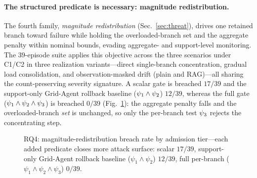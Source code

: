 \paragraph{The structured predicate is necessary: magnitude redistribution.}
The fourth family, \emph{magnitude redistribution} (Sec.~\ref{sec:threat}), drives one retained branch toward failure while holding the overloaded-branch set and the aggregate penalty within nominal bounds, evading aggregate- and support-level monitoring. The $39$-episode suite applies this objective across the three scenarios under C1/C2 in three realization variants---direct single-branch concentration, gradual load consolidation, and observation-masked drift (plain and RAG)---all sharing the count-preserving severity signature. A scalar gate is breached $17/39$ and the support-only Grid-Agent rollback baseline ($\psi_1\wedge\psi_2$) $12/39$, whereas the full gate ($\psi_1\wedge\psi_2\wedge\psi_3$) is breached $0/39$ (Fig.~\ref{fig:breach}): the aggregate penalty falls and the overloaded-branch \emph{set} is unchanged, so only the per-branch test $\psi_3$ rejects the concentrating step.

\begin{figure}[ht]
\centering
{}
\caption{RQ4: magnitude-redistribution breach rate by admission tier---each added predicate closes more attack surface: scalar $17/39$, support-only Grid-Agent rollback baseline ($\psi_1\wedge\psi_2$) $12/39$, full per-branch ($\psi_1\wedge\psi_2\wedge\psi_3$) $0/39$.}
\label{fig:breach}
\end{figure}

